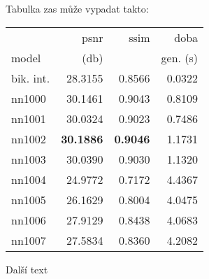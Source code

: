 			Tabulka zas může vypadat takto:

			\begin{table}[hbt!]
				\centering
				\begin{tabular}{| l | r | r | r | }
					\hline
					&        psnr &      ssim &      doba  \\
					model &       (db)    &           & gen. (s) \\
					\hline
					bik. int. & 28.3155 & 0.8566 & 0.0322 \\
					nn1000    & 30.1461 & 0.9043 & 0.8109 \\
					nn1001    & 30.0324 & 0.9023 & 0.7486 \\
					nn1002    & \textbf{30.1886} & \textbf{0.9046} & 1.1731 \\
					nn1003    & 30.0390 & 0.9030 & 1.1320 \\
					nn1004    & 24.9772 & 0.7172 & 4.4367 \\
					nn1005    & 26.1629 & 0.8004 & 4.0475 \\
					nn1006    & 27.9129 & 0.8438 & 4.0683 \\
					nn1007    & 27.5834 & 0.8360 & 4.2082 \\
					\hline
				\end{tabular}
			\end{table}

			\newpage

			Další text


